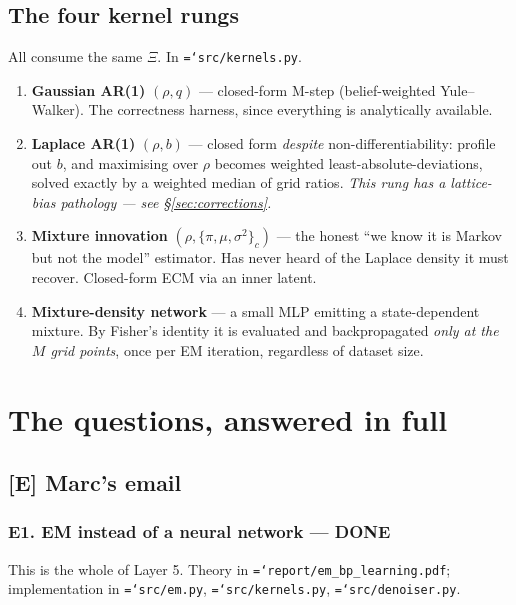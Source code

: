 \documentclass[11pt,a4paper]{article}
\newcommand{\done}{\textcolor{GoodGreen}{\textbf{DONE}}}
\newcommand{\code}[1]{\texttt{\small\hyphenchar\font=`\-\relax #1}}
\begin{document}
\subsection{The four kernel rungs}

All consume the same $\Xi$. In \code{src/kernels.py}.

\begin{enumerate}
\item \textbf{Gaussian AR(1)} $(\rho,q)$ --- closed-form M-step (belief-weighted
Yule--Walker). The correctness harness, since everything is analytically available.
\item \textbf{Laplace AR(1)} $(\rho,b)$ --- closed form \emph{despite} non-differentiability:
profile out $b$, and maximising over $\rho$ becomes weighted least-absolute-deviations,
solved exactly by a weighted median of grid ratios. \emph{This rung has a lattice-bias
pathology --- see \S\ref{sec:corrections}.}
\item \textbf{Mixture innovation} $(\rho, \{\pi,\mu,\sigma^2\}_c)$ --- the honest ``we know
it is Markov but not the model'' estimator. Has never heard of the Laplace density it must
recover. Closed-form ECM via an inner latent.
\item \textbf{Mixture-density network} --- a small MLP emitting a state-dependent mixture.
By Fisher's identity it is evaluated and backpropagated \emph{only at the $M$ grid points},
once per EM iteration, regardless of dataset size.
\end{enumerate}

\newpage
\section{The questions, answered in full}
\label{sec:questions}

\subsection{[E] Marc's email}

\subsubsection*{E1. EM instead of a neural network --- \done}

This is the whole of Layer 5. Theory in \code{report/em\_bp\_learning.pdf};
implementation in \code{src/em.py}, \code{src/kernels.py}, \code{src/denoiser.py}.
\end{document}
